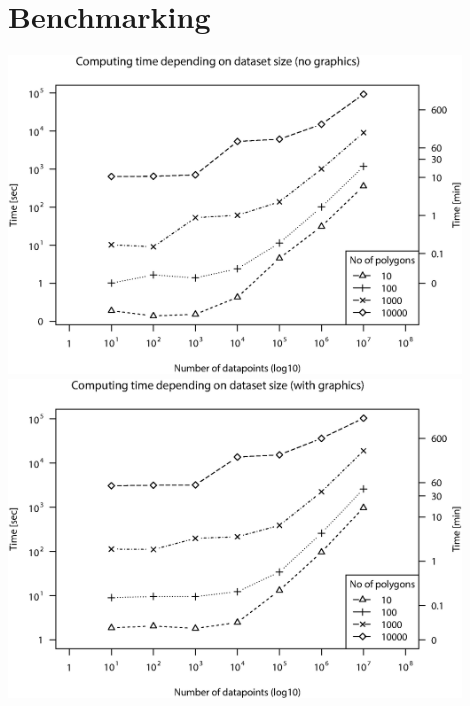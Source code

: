 \documentclass[a4paper,titlepage,11pt]{scrreprt}
\begin{document}
\chapter{Benchmarking}

\centering
\includegraphics[width=0.9\textwidth]{figures/bm_no_graphics.eps}\\
\vspace{2cm}
\includegraphics[width=0.9\textwidth]{figures/bm_graphics.eps}
\end{document}
